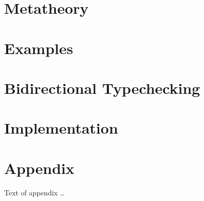 \documentclass[acmsmall,review,anonymous]{acmart}\settopmatter{printfolios=true,printccs=false,printacmref=false}
\begin{document}
\section{Metatheory}

\section{Examples}

\section{Bidirectional Typechecking}

\section{Implementation}





%


\appendix
\section{Appendix}

Text of appendix \ldots
\end{document}
